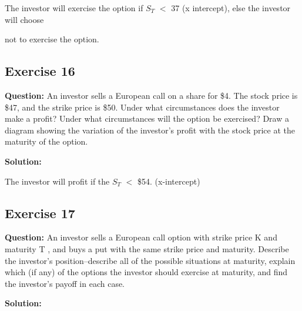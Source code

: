 \documentclass{article}
\begin{document}
The investor will exercise the option if $S_T$ $<$ 37 (x intercept), else the investor will choose 

not to exercise the option.

\subsection*{Exercise 16}

\textbf{Question:} An investor sells a European call on a share for \$4. The stock price is \$47, and the strike price is
\$50. Under what circumstances does the investor make a profit? Under what circumstances will the option be
exercised? Draw a diagram showing the variation of the investor’s profit with the stock price at the maturity of
the option.

\textbf{Solution:} 


The investor will profit if the $S_T$ $<$ \$54. (x-intercept)

\subsection*{Exercise 17}

\textbf{Question:} An investor sells a European call option with strike price K and maturity T , and buys a put with
the same strike price and maturity. Describe the investor’s position–describe all of the possible situations at
maturity, explain which (if any) of the options the investor should exercise at maturity, and find the investor’s
payoff in each case.


\textbf{Solution:} 
\end{document}
